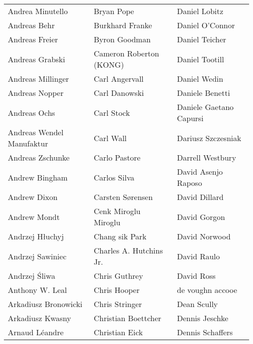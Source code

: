 \begin{small}
\begin{tabular}{p{4cm}p{4cm}p{4cm}}
Andrea Minutello & Bryan Pope & Daniel Lobitz \\
Andreas Behr & Burkhard Franke & Daniel O'Connor \\
Andreas Freier & Byron Goodman & Daniel Teicher \\
Andreas Grabski & Cameron Roberton (KONG) & Daniel Tootill \\
Andreas Millinger & Carl Angervall & Daniel Wedin \\
Andreas Nopper & Carl Danowski & Daniele Benetti \\
Andreas Ochs & Carl Stock & Daniele Gaetano Capursi \\
Andreas Wendel Manufaktur & Carl Wall & Dariusz Szczesniak \\
Andreas Zschunke & Carlo Pastore & Darrell Westbury \\
Andrew Bingham & Carlos Silva & David Asenjo Raposo \\
Andrew Dixon & Carsten Sørensen & David Dillard \\
Andrew Mondt & Cenk Miroglu Miroglu & David Gorgon \\
Andrzej Hłuchyj & Chang sik Park & David Norwood \\
Andrzej Sawiniec & Charles A. Hutchins Jr. & David Raulo \\
Andrzej Śliwa & Chris Guthrey & David Ross \\
Anthony W. Leal & Chris Hooper & de voughn accooe \\
Arkadiusz Bronowicki & Chris Stringer & Dean Scully \\
Arkadiusz Kwasny & Christian Boettcher & Dennis Jeschke \\
Arnaud Léandre & Christian Eick & Dennis Schaffers \\
\end{tabular}
\end{small}
\newpage
\setlength{\tabcolsep}{1mm}
